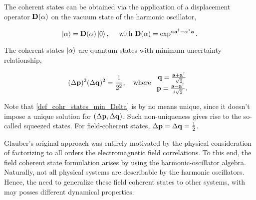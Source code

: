 \documentclass{homework}
\begin{document}
\begin{definition}

The coherent states can be obtained via the application of a displacement operator ${\bf D}(\alpha)$ on the vacuum state of the harmonic oscillator, 

\begin{equation}
    \ket{\alpha} = {\bf D}(\alpha)\ket{0}, \quad \textnormal{ with } {\bf D}(\alpha) = \exp^{\alpha {\bf a}^\dagger - \alpha^* {\bf a}}. 
\end{equation}

\end{definition}

\begin{definition}\label{def_cohr_states_min_Delta}

The coherent states $\ket{\alpha}$ are quantum states with minimum-uncertainty relationship, 

\begin{equation}
    (\Delta {\bf p})^2 (\Delta {\bf q})^2 = \frac{1}{2^2}, \quad \textnormal{where } \begin{array}{cc}
        {\bf q} = \frac{{\bf a}+{\bf a}^\dagger}{\sqrt{2}}  \\
        {\bf p} = \frac{{\bf a}-{\bf a}^\dagger}{i\sqrt{2}}.
    \end{array}
\end{equation}

\end{definition}

\begin{remark}

Note that \cref{def_cohr_states_min_Delta} is by no means unique, since it doesn't impose a unique solution for $(\Delta {\bf p}, \Delta {\bf q})$. Such non-uniqueness gives rise to the so-called squeezed states. For field-coherent states, $\Delta {\bf p} = \Delta {\bf q} = \frac{1}{2}$. 

\end{remark}

\begin{tcolorbox}[title = Physical Context, colback = yellow]

Glauber's original approach was entirely motivated by the physical consideration of factorizing to all orders the electromagnetic field correlations. To this end, the field coherent state formulation arises by using the harmonic-oscillator algebra. Naturally, not all physical systems are describable by the harmonic oscillators. Hence, the need to generalize these field coherent states to other systems, with may posses different dynamical properties. 

\end{tcolorbox}
\end{document}
